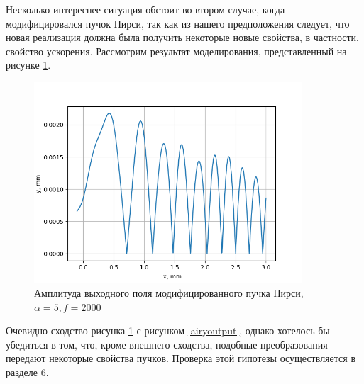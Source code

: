 {	Несколько интереснее ситуация обстоит во втором случае, когда модифицировался пучок Пирси, так как из нашего предположения следует, что новая реализация должна была получить некоторые новые свойства, в частности, свойство ускорения. Рассмотрим результат моделирования, представленный на рисунке \ref{peodd_output}.
	\begin{figure}[H]
		  \begin{center}
			\includegraphics[width=10cm]{plots/peodd_output}
	\caption{Амплитуда выходного поля модифицированного пучка Пирси, $ \alpha  = 5, f = 2000$}
	\label{peodd_output}
		 \end{center}
\end{figure}
Очевидно сходство рисунка \ref{peodd_output} с рисунком \ref{airyoutput}, однако хотелось бы убедиться в том, что, кроме внешнего сходства, подобные преобразования передают некоторые свойства пучков. Проверка этой гипотезы осуществляется в разделе 6.
}
\newpage
